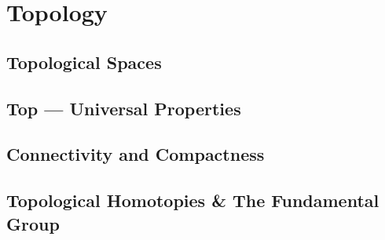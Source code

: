 % 
% 
% 
% 
% 

\part{Topology}

\chapter{Topological Spaces}









\chapter{\textbf{Top} --- Universal Properties}





\chapter{Connectivity and Compactness}



\chapter{Topological Homotopies \& The Fundamental Group}





% 
% 
% 
% 
% 


% 


% 
% 

\backmatter

\printbibliography


